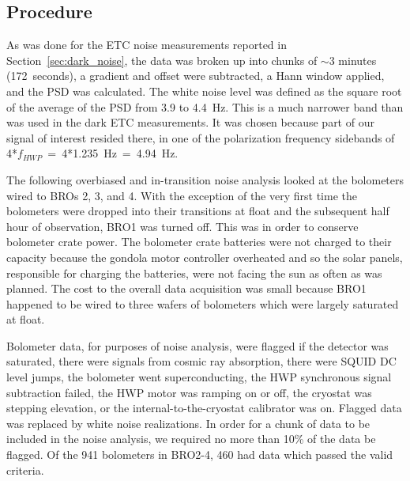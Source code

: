 \subsection{Procedure}
\label{sec:procedure}



As was done for the \ac{ETC} noise measurements reported in Section~\ref{sec:dark_noise}, the data was broken up into chunks of $\sim$3 minutes (172~seconds),
a gradient and offset were subtracted, a Hann window applied, and the \ac{PSD} was calculated. 
The white noise level was defined as the square root of the average of the \ac{PSD} from 3.9 to 4.4~Hz. 
This is a much narrower band than was used in the dark \ac{ETC} measurements. 
It was chosen because part of our signal of interest resided there, in one of the polarization frequency sidebands of 4*$f_{HWP}$~=~4*1.235~Hz~=~4.94~Hz. 

The following overbiased and in-transition noise analysis looked at the bolometers wired to \ac{BRO}s 2, 3, and 4. 
With the exception of the very first time the bolometers were dropped into their transitions at float and the subsequent half hour of observation, \ac{BRO}1 was turned off. 
This was in order to conserve bolometer crate power.
The bolometer crate batteries were not charged to their capacity because the gondola motor controller overheated and so the solar panels, responsible for charging the batteries, were not facing the sun as often as was planned. 
The cost to the overall data acquisition was small because \ac{BRO}1 happened to be wired to three wafers of bolometers which were largely saturated at float. 

Bolometer data, for purposes of noise analysis, were flagged if the detector was saturated, there were signals from cosmic ray absorption, there were \ac{SQUID} DC level jumps, the bolometer went superconducting, the \ac{HWP} synchronous signal subtraction failed, the \ac{HWP} motor was ramping on or off, the cryostat was stepping elevation, or the internal-to-the-cryostat calibrator was on. 
Flagged data was replaced by white noise realizations. 
In order for a chunk of data to be included in the noise analysis, we required no more than 10\% of the data be flagged. 
Of the 941 bolometers in \ac{BRO}2-4, 460 had data which passed the valid criteria. 

